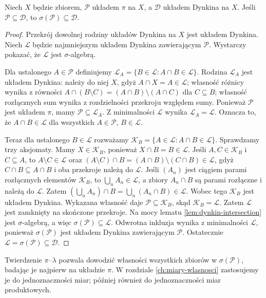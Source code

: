 \begin{twierdzenie}
\label{thm:pi-lambda}
Niech $X$ będzie zbiorem, $\mathcal P$ układem $\pi$ na $X$,
a $\mathcal D$ układem Dynkina na $X$. Jeśli
$\mathcal P\subseteq\mathcal D$, to
$\sigma(\mathcal P)\subseteq\mathcal D$.
\end{twierdzenie}
\begin{proof}
Przekrój dowolnej rodziny układów Dynkina na $X$ jest układem Dynkina.
Niech $\mathcal L$ będzie najmniejszym układem Dynkina zawierającym
$\mathcal P$. Wystarczy pokazać, że $\mathcal L$ jest $\sigma$-algebrą.

Dla ustalonego $A\in\mathcal P$ definiujemy
$\mathcal L_A=\{B\in\mathcal L:A\cap B\in\mathcal L\}$.
Rodzina $\mathcal L_A$ jest układem Dynkina: należy do niej $X$, gdyż
$A\cap X=A\in\mathcal L$; własność różnicy wynika z równości
$A\cap(B\setminus C)=(A\cap B)\setminus(A\cap C)$ dla $C\subseteq B$;
własność rozłącznych sum wynika z rozdzielności przekroju względem sumy.
Ponieważ $\mathcal P$ jest układem $\pi$, mamy
$\mathcal P\subseteq\mathcal L_A$. Z minimalności $\mathcal L$ wynika
$\mathcal L_A=\mathcal L$. Oznacza to, że
$A\cap B\in\mathcal L$ dla wszystkich $A\in\mathcal P$, $B\in\mathcal L$.

Teraz dla ustalonego $B\in\mathcal L$ rozważamy
$\mathcal K_B=\{A\in\mathcal L:A\cap B\in\mathcal L\}$.
Sprawdzamy trzy aksjomaty. Mamy $X\in\mathcal K_B$, ponieważ
$X\cap B=B\in\mathcal L$. Jeśli $A,C\in\mathcal K_B$ i $C\subseteq A$,
to $A\setminus C\in\mathcal L$ oraz
$(A\setminus C)\cap B=(A\cap B)\setminus(C\cap B)\in\mathcal L$,
gdyż $C\cap B\subseteq A\cap B$ i oba przekroje należą do $\mathcal L$.
Jeśli $(A_n)$ jest ciągiem parami rozłącznych elementów $\mathcal K_B$,
to $\bigcup_n A_n\in\mathcal L$, a zbiory $A_n\cap B$ są parami
rozłączne i należą do $\mathcal L$. Zatem
$(\bigcup_n A_n)\cap B=\bigcup_n(A_n\cap B)\in\mathcal L$.
Wobec tego $\mathcal K_B$ jest układem Dynkina. Wykazana własność daje
$\mathcal P\subseteq\mathcal K_B$, skąd
$\mathcal K_B=\mathcal L$. Zatem $\mathcal L$ jest zamknięty
na skończone przekroje. Na mocy lematu \ref{lem:dynkin-intersection}
jest $\sigma$-algebrą, a więc $\sigma(\mathcal P)\subseteq\mathcal L$.
Odwrotna inkluzja wynika z minimalności $\mathcal L$, ponieważ
$\sigma(\mathcal P)$ jest układem Dynkina zawierającym $\mathcal P$.
Ostatecznie $\mathcal L=\sigma(\mathcal P)\subseteq\mathcal D$.
\end{proof}

\begin{uwaga}
Twierdzenie $\pi$--$\lambda$ pozwala dowodzić własności wszystkich
zbiorów w $\sigma(\mathcal P)$, badając je najpierw na układzie
$\pi$. W rozdziale \ref{ch:miary-wlasnosci} zastosujemy je do
jednoznaczności miar; później również do jednoznaczności miar produktowych.
\end{uwaga}

